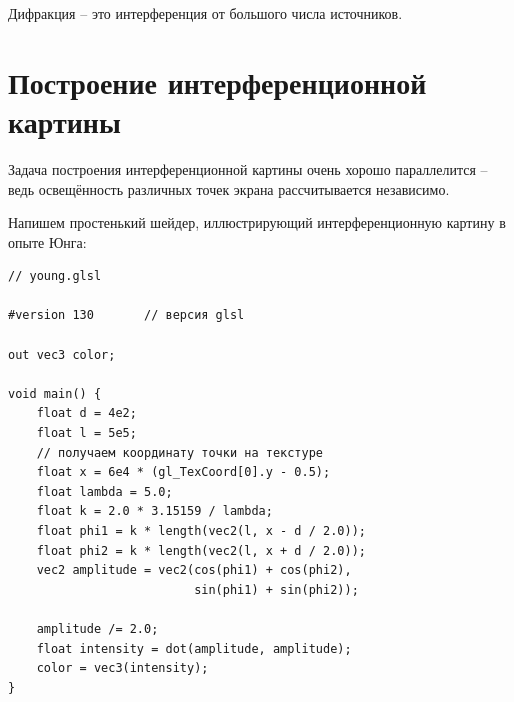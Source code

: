 \documentclass{ncc}
\begin{document}
Дифракция -- это интерференция от большого числа источников.

\section{Построение интерференционной картины}
Задача построения интерференционной картины очень хорошо параллелится -- ведь
освещённость различных точек экрана рассчитывается независимо.

Напишем простенький шейдер, иллюстрирующий интерференционную картину в опыте Юнга:

\begin{lstlisting}
// young.glsl

#version 130       // версия glsl

out vec3 color;

void main() {
    float d = 4e2;
    float l = 5e5;
    // получаем координату точки на текстуре
    float x = 6e4 * (gl_TexCoord[0].y - 0.5);
    float lambda = 5.0;
    float k = 2.0 * 3.15159 / lambda;
    float phi1 = k * length(vec2(l, x - d / 2.0));
    float phi2 = k * length(vec2(l, x + d / 2.0));
    vec2 amplitude = vec2(cos(phi1) + cos(phi2),
                          sin(phi1) + sin(phi2));

    amplitude /= 2.0;
    float intensity = dot(amplitude, amplitude);
    color = vec3(intensity);
}
\end{lstlisting}
\end{document}
